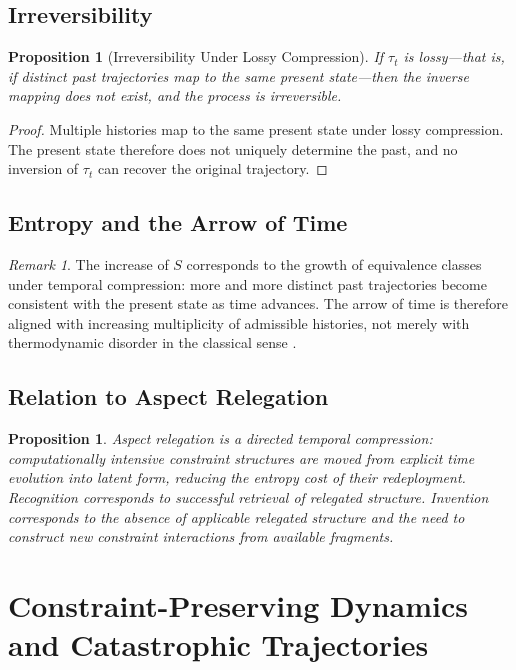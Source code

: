 \documentclass[11pt]{article}
\theoremstyle{plain}
\newtheorem{proposition}[theorem]{Proposition}
\theoremstyle{definition}
\theoremstyle{remark}
\newtheorem{remark}[theorem]{Remark}
\newcommand{\Ss}{S}
\begin{document}
\subsection{Irreversibility}

\begin{proposition}[Irreversibility Under Lossy Compression]
If $\tau_t$ is lossy---that is, if distinct past trajectories map to
the same present state---then the inverse mapping does not exist, and
the process is irreversible.
\end{proposition}

\begin{proof}
Multiple histories map to the same present state under lossy compression.
The present state therefore does not uniquely determine the past, and
no inversion of $\tau_t$ can recover the original trajectory.
\end{proof}

\subsection{Entropy and the Arrow of Time}

\begin{remark}
The increase of $\Ss$ corresponds to the growth of equivalence classes
under temporal compression: more and more distinct past trajectories
become consistent with the present state as time advances. The arrow
of time is therefore aligned with increasing multiplicity of admissible
histories, not merely with thermodynamic disorder in the classical
sense \cite{shannon1948mathematical,cover2006elements}.
\end{remark}

\subsection{Relation to Aspect Relegation}

\begin{proposition}
Aspect relegation is a directed temporal compression: computationally
intensive constraint structures are moved from explicit time evolution
into latent form, reducing the entropy cost of their redeployment.
Recognition corresponds to successful retrieval of relegated structure.
Invention corresponds to the absence of applicable relegated structure
and the need to construct new constraint interactions from available
fragments.
\end{proposition}

\section{Constraint-Preserving Dynamics and Catastrophic Trajectories}
\end{document}
